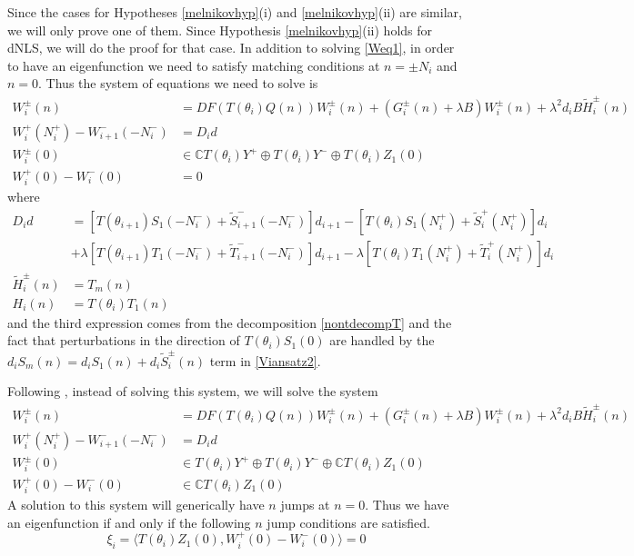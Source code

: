 \documentclass[12pt]{article}
\def\C{{\mathbb C}}
\begin{document}
Since the cases for Hypotheses \ref{melnikovhyp}(i) and \ref{melnikovhyp}(ii) are similar, we will only prove one of them. Since Hypothesis \ref{melnikovhyp}(ii) holds for dNLS, we will do the proof for that case. In addition to solving \eqref{Weq1}, in order to have an eigenfunction we need to satisfy matching conditions at $n = \pm N_i$ and $n = 0$. Thus the system of equations we need to solve is
\begin{align*}
W_i^\pm(n) &= DF(T(\theta_i) Q(n) ) W_i^\pm(n) + (G_i^\pm(n) + \lambda B) W_i^\pm(n) + \lambda^2 d_i B \tilde{H}_i^\pm(n) \\
W_i^+(N_i^+) - W_{i+1}^-(-N_i^-) &= D_i d \\
W_i^\pm(0) &\in \C T(\theta_i)Y^+ \oplus T(\theta_i)Y^- \oplus T(\theta_i) Z_1(0) \\ 
W_i^+(0) - W_i^-(0) &= 0 
\end{align*}
where
\begin{align*}
D_i d &= [ T(\theta_{i+1}) S_1(-N_i^-) + \tilde{S}_{i+1}^-(-N_i^-)] d_{i+1}
- [ T(\theta_i) S_1(N_i^+) + \tilde{S}_i^+(N_i^+)] d_i \\
&+ \lambda[ T(\theta_{i+1}) T_1(-N_i^-) + \tilde{T}_{i+1}^-(-N_i^-)] d_{i+1}
- \lambda[ T(\theta_i) T_1(N_i^+) + \tilde{T}_i^+(N_i^+)] d_i \\
\tilde{H}_i^\pm(n) &= T_m(n) \\
H_i(n) &= T(\theta_i) T_1(n)
\end{align*}
and the third expression comes from the decomposition \eqref{nontdecompT} and the fact that perturbations in the direction of $T(\theta_i)S_1(0)$ are handled by the $d_i S_m(n) = d_i S_1(n) + d_i \tilde{S}_i^\pm(n)$ term in \eqref{Viansatz2}.

Following \cite{Sandstede1998}, instead of solving this system, we will solve the system
\begin{align}
W_i^\pm(n) &= DF(T(\theta_i) Q(n) ) W_i^\pm(n) + (G_i^\pm(n) + \lambda B) W_i^\pm(n) + \lambda^2 d_i B \tilde{H}_i^\pm(n) \label{eigsystem1} \\
W_i^+(N_i^+) - W_{i+1}^-(-N_i^-) &= D_i d \label{eigsystem2} \\
W_i^\pm(0) &\in T(\theta_i) Y^+ \oplus T(\theta_i) Y^- \oplus \C T(\theta_i) Z_1(0) \label{eigsystem3a} \\
W_i^+(0) - W_i^-(0) &\in \C T(\theta_i) Z_1(0) \label{eigsystem3b} 
\end{align}
A solution to this system will generically have $n$ jumps at $n = 0$. Thus we have an eigenfunction if and only if the following $n$ jump conditions are satisfied.
\begin{equation}\label{jumpcond}
\xi_i = \langle T(\theta_i) Z_1(0), W_i^+(0) - W_i^-(0) \rangle = 0
\end{equation}
\end{document}
